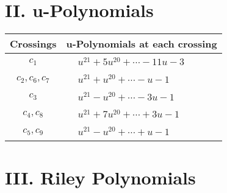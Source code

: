 \documentclass[1p]{elsarticle_modified}
\theoremstyle{definition}
\begin{document}
\newpage\renewcommand{\arraystretch}{1}
\centering \section*{ II. u-Polynomials}
\begin{tabular}{m{50pt}|m{274pt}}
Crossings & \hspace{64pt}u-Polynomials at each crossing \\
\hline $$\begin{aligned}c_{1}\end{aligned}$$&$\begin{aligned}
&u^{21}+5 u^{20}+\cdots-11 u-3
\end{aligned}$\\
\hline $$\begin{aligned}c_{2},c_{6},c_{7}\end{aligned}$$&$\begin{aligned}
&u^{21}+u^{20}+\cdots- u-1
\end{aligned}$\\
\hline $$\begin{aligned}c_{3}\end{aligned}$$&$\begin{aligned}
&u^{21}- u^{20}+\cdots-3 u-1
\end{aligned}$\\
\hline $$\begin{aligned}c_{4},c_{8}\end{aligned}$$&$\begin{aligned}
&u^{21}+7 u^{20}+\cdots+3 u-1
\end{aligned}$\\
\hline $$\begin{aligned}c_{5},c_{9}\end{aligned}$$&$\begin{aligned}
&u^{21}- u^{20}+\cdots+u-1
\end{aligned}$\\
\hline
\end{tabular}\newpage\renewcommand{\arraystretch}{1}
\centering \section*{ III. Riley Polynomials}
\end{document}
